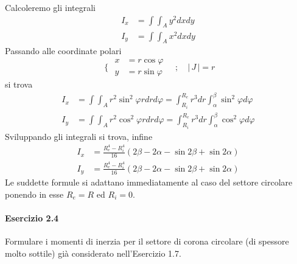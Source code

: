\noindent Calcoleremo gli integrali 
\begin{align*}
I_x &= \int\int_A y^{2}dxdy \\
I_y &= \int\int_A x^{2}dxdy
\end{align*}
Passando alle coordinate polari
\begin{equation*}
\,\,\Biggr\{\,\, 
\begin{aligned}
x &= r\cos\varphi \\
y &= r\sin\varphi 
\end{aligned}
\quad ; \quad \lvert\, J \,\lvert = r
\end{equation*}
si trova
\begin{align*}
I_x &= \int\int_A r^{2}\sin^{2}\varphi rdrd\varphi = \int_{R_i}^{R_e}r^{3}dr\int_{\alpha}^{\beta}\sin^{2}\varphi d\varphi \\
I_y &= \int\int_A r^{2}\cos^{2}\varphi rdrd\varphi = \int_{R_i}^{R_e}r^{3}dr\int_{\alpha}^{\beta}\cos^{2}\varphi d\varphi
\end{align*}
Sviluppando gli integrali si trova, infine
\begin{align*}
I_x &= \frac{R_{e}^{4}-R_{i}^{4}}{16}(2\beta-2\alpha-\sin 2\beta+\sin 2\alpha)  \\
I_y &= \frac{R_{e}^{4}-R_{i}^{4}}{16}(2\beta-2\alpha-\sin 2\beta+\sin 2\alpha)
\end{align*}
Le suddette formule si adattano immediatamente al caso del settore circolare ponendo in esse $R_e = R$ ed $R_i=0$.
\clearpage
\paragraph{Esercizio 2.4}
Formulare i momenti di inerzia per il settore di corona circolare (di spessore molto sottile) già considerato nell'Esercizio 1.7.
\newline

